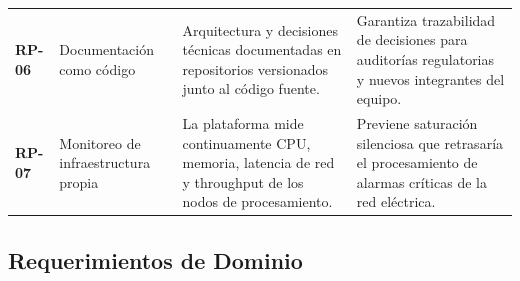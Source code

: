 \documentclass[12pt, letterpaper]{article}
\begin{document}
\begin{longtable}{
  C{1.5cm}
  P{2.8cm}
  P{5.2cm}
  P{4.2cm}
}
\textbf{RP-06} & Documentación como código &
  Arquitectura y decisiones técnicas documentadas en repositorios versionados junto al código
  fuente. &
  Garantiza trazabilidad de decisiones para auditorías regulatorias y nuevos integrantes del
  equipo. \\

\textbf{RP-07} & Monitoreo de infraestructura propia &
  La plataforma mide continuamente CPU, memoria, latencia de red y throughput de los nodos
  de procesamiento. &
  Previene saturación silenciosa que retrasaría el procesamiento de alarmas críticas de la red
  eléctrica. \\

\end{longtable}

\subsection{Requerimientos de Dominio}
\end{document}
